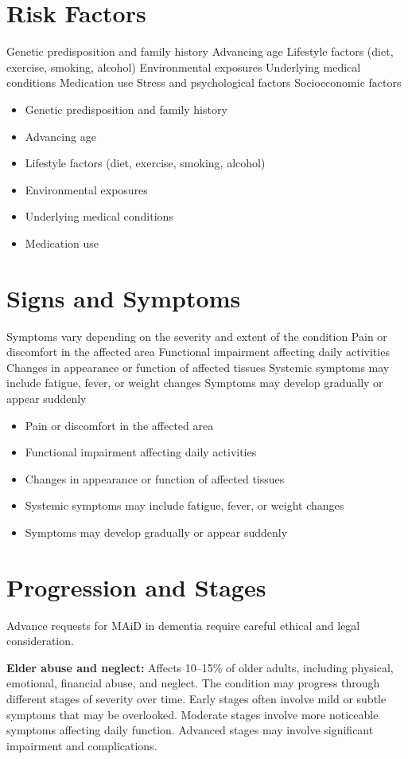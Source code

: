 \section{Risk Factors}
Genetic predisposition and family history Advancing age Lifestyle factors (diet, exercise, smoking, alcohol) Environmental exposures Underlying medical conditions Medication use Stress and psychological factors Socioeconomic factors

\begin{itemize}[noitemsep]
  \item Genetic predisposition and family history
  \item Advancing age
  \item Lifestyle factors (diet, exercise, smoking, alcohol)
  \item Environmental exposures
  \item Underlying medical conditions
  \item Medication use
\end{itemize}
\section{Signs and Symptoms}
Symptoms vary depending on the severity and extent of the condition Pain or discomfort in the affected area Functional impairment affecting daily activities Changes in appearance or function of affected tissues Systemic symptoms may include fatigue, fever, or weight changes Symptoms may develop gradually or appear suddenly

\begin{itemize}[noitemsep]
  \item Pain or discomfort in the affected area
  \item Functional impairment affecting daily activities
  \item Changes in appearance or function of affected tissues
  \item Systemic symptoms may include fatigue, fever, or weight changes
  \item Symptoms may develop gradually or appear suddenly
\end{itemize}
\section{Progression and Stages}
Advance requests for MAiD in dementia require careful ethical and legal consideration.
  \item \textbf{Elder abuse and neglect:} Affects 10--15\% of older adults, including physical, emotional, financial abuse, and neglect. The condition may progress through different stages of severity over time. Early stages often involve mild or subtle symptoms that may be overlooked. Moderate stages involve more noticeable symptoms affecting daily function. Advanced stages may involve significant impairment and complications.
